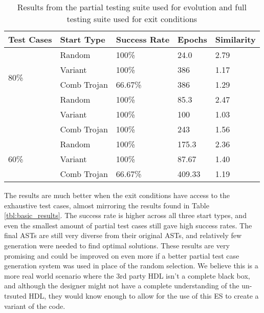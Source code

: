\documentclass[conference]{IEEEtran}
\begin{document}
{\begin{table}
    \begin{tabular}[\textwidth]{||p{0.8cm}|p{2.2cm}|p{1cm}|p{1cm}|p{1cm}||}
         \hline
         Test Cases & Start Type & Success Rate & Epochs & Similarity \\ [0.5ex] 
         \hline\hline
         \hline
         \multirow{4}{5em}{80\%} 
         & Random  & 100\% & 24.0 & 2.79 \\  
         & Variant & 100\% & 386 & 1.17 \\
         & Comb Trojan & 66.67\% & 386 & 1.29 \\
         \hline  
         \multirow{4}{5em}{70\%} 
         & Random  & 100\% & 85.3 & 2.47 \\ 
         & Variant & 100\% & 100 & 1.03 \\ 
         & Comb Trojan & 100\% & 243 & 1.56 \\
         \hline  
         \multirow{4}{5em}{60\%} 
         & Random  & 100\% & 175.3 & 2.36 \\  
         & Variant & 100\% & 87.67 & 1.40 \\
         & Comb Trojan & 66.67\% & 409.33 & 1.19 \\
         \hline  
    \end{tabular}
    \caption{Results from the partial testing suite used for evolution and full testing suite used for exit conditions}
    \label{tbl:full}
\end{table}

\par The results are much better when the exit conditions have access to the exhaustive test cases, almost mirroring the results found in Table \ref{tbl:basic_results}. 
The success rate is higher across all three start types, and even the smallest amount of partial test cases still gave high success rates. 
The final ASTs are still very diverse from their original ASTs, and relatively few generation were needed to find optimal solutions. 
These results are very promising and could be improved on even more if a better partial test case generation system was used in place of the random selection. 
We believe this is a more real world scenario where the 3rd party HDL isn't a complete black box, and although the designer might not have a complete understanding of the un-trsuted HDL, they would know enough to allow for the use of this ES to create a variant of the code.

}
\end{document}
